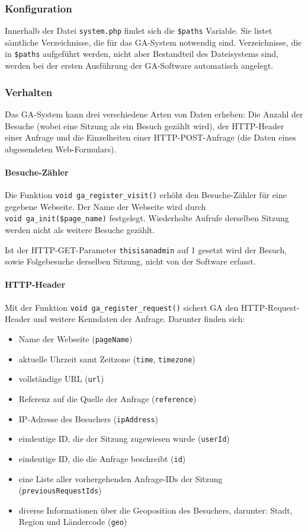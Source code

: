 \subsubsection{Konfiguration}
\label{ssub:ga_konfiguration}
Innerhalb der Datei \texttt{system.php} findet sich die \texttt{\$paths}
Variable. Sie listet sämtliche Verzeichnisse, die für das GA-System notwendig
sind. Verzeichnisse, die in \texttt{\$paths} aufgeführt werden, nicht aber
Bestandteil des Dateisystems sind, werden bei der ersten Ausführung der
GA-Software automatisch angelegt.

\subsubsection{Verhalten}
\label{ssub:verhalten}
Das GA-System kann drei verschiedene Arten von Daten erheben: Die Anzahl der
Besuche (wobei eine Sitzung als ein Besuch gezählt wird), der HTTP-Header einer
Anfrage und die Einzelheiten einer HTTP-POST-Anfrage (die Daten eines
abgesendeten Web-Formulars).

\paragraph{Besuche-Zähler}
\label{par:ga_besuche_zahler}
Die Funktion \texttt{void\ ga\_register\_visit()} erhöht den Besuche-Zähler für
eine gegebene Webseite. Der Name der Webseite wird durch \texttt{void\
ga\_init(\$page\_name)} festgelegt. Wiederholte Aufrufe derselben Sitzung
werden nicht als weitere Besuche gezählt.

Ist der HTTP-GET-Parameter \texttt{thisisanadmin} auf 1 gesetzt wird der
Besuch, sowie Folgebesuche derselben Sitzung, nicht von der Software erfasst.

\paragraph{HTTP-Header}
\label{par:ga_http_header}
Mit der Funktion \texttt{void\ ga\_register\_request()} sichert GA den
HTTP-Request-Header und weitere Kenndaten der Anfrage. Darunter finden sich:

\begin{itemize}
\item
  Name der Webseite (\texttt{pageName})
\item
  aktuelle Uhrzeit samt Zeitzone (\texttt{time}, \texttt{timezone})
\item
  vollständige URL (\texttt{url})
\item
  Referenz auf die Quelle der Anfrage (\texttt{reference})
\item
  IP-Adresse des Besuchers (\texttt{ipAddress})
\item
  eindeutige ID, die der Sitzung zugewiesen wurde (\texttt{userId})
\item
  eindeutige ID, die die Anfrage beschreibt (\texttt{id})
\item
  eine Liste aller vorhergehenden Anfrage-IDs der Sitzung
  (\texttt{previousRequestIds})
\item
  diverse Informationen über die Geoposition des Besuchers, darunter: Stadt,
  Region und Ländercode (\texttt{geo})
\end{itemize}

